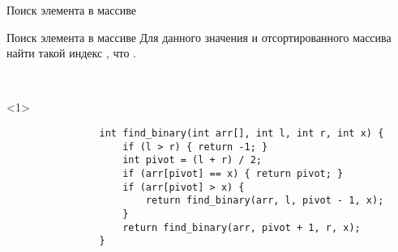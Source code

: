 \documentclass[aspectratio=169,14pt]{beamer}
\begin{document}
\begin{frame}[fragile]{Поиск элемента в массиве}
\begin{onlyenv}
\begin{enumerate}
\begin{onlyenv}
                    \end{onlyenv}
            \end{enumerate}
        \end{onlyenv}
    \end{frame}

    \begin{frame}[fragile]{Поиск элемента в массиве}
        Для данного значения  и отсортированного массива  найти такой индекс , что
        .

        ~\\
        \begin{onlyenv}<1>
            \begin{verbatim}
                int find_binary(int arr[], int l, int r, int x) {
                    if (l > r) { return -1; }
                    int pivot = (l + r) / 2;
                    if (arr[pivot] == x) { return pivot; }
                    if (arr[pivot] > x) {
                        return find_binary(arr, l, pivot - 1, x);
                    }
                    return find_binary(arr, pivot + 1, r, x);
                }
            \end{verbatim}
        \end{onlyenv}
    \end{frame}
\end{document}
